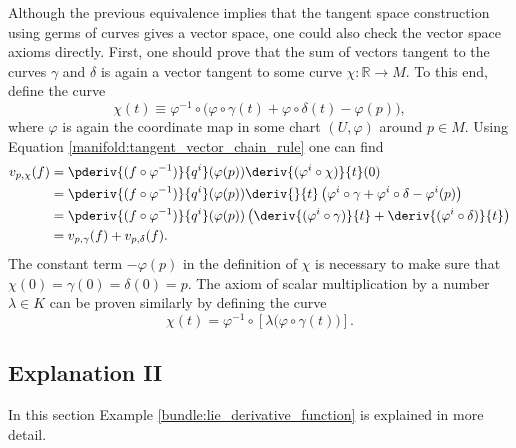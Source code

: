     Although the previous equivalence implies that the tangent space construction using germs of curves gives a vector space, one could also check the vector space axioms directly. First, one should prove that the sum of vectors tangent to the curves $\gamma$ and $\delta$ is again a vector tangent to some curve $\chi:\mathbb{R}\rightarrow M$. To this end, define the curve \[\chi(t)\equiv\varphi^{-1}\circ\Big(\varphi\circ\gamma(t) + \varphi\circ\delta(t) - \varphi(p)\Big),\] where $\varphi$ is again the coordinate map in some chart $(U,\varphi)$ around $p\in M$. Using Equation \eqref{manifold:tangent_vector_chain_rule} one can find
    \begin{align*}
        v_{p,\chi}(f) &= \pderiv{(f\circ\varphi^{-1})}{q^i}(\varphi(p))\deriv{(\varphi^i\circ\chi)}{t}(0)\\
        &=\pderiv{(f\circ\varphi^{-1})}{q^i}(\varphi(p))\deriv{}{t}\left(\varphi^i\circ\gamma + \varphi^i\circ\delta - \varphi^i(p)\right)\\
        &=\pderiv{(f\circ\varphi^{-1})}{q^i}(\varphi(p))\left(\deriv{(\varphi^i\circ\gamma)}{t} + \deriv{(\varphi^i\circ\delta)}{t}\right)\\
        &=v_{p,\gamma}(f) + v_{p,\delta}(f).
    \end{align*}
    The constant term $-\varphi(p)$ in the definition of $\chi$ is necessary to make sure that $\chi(0) = \gamma(0) = \delta(0) = p$. The axiom of scalar multiplication by a number $\lambda\in K$ can be proven similarly by defining the curve \[\chi(t) = \varphi^{-1}\circ\left[\lambda\Big(\varphi\circ\gamma(t)\Big)\right].\]

\subsection{Explanation II}

    In this section Example \ref{bundle:lie_derivative_function} is explained in more detail.

